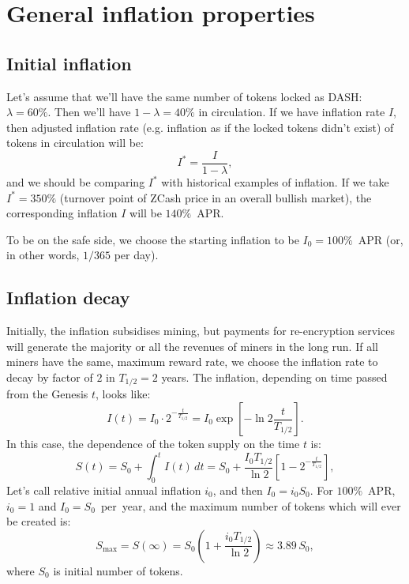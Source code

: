 \documentclass[longbibliography,nofootinbib,twocolumn]{revtex4-1}
\begin{document}
\section{General inflation properties}

\subsection{Initial inflation}

Let's assume that we'll have the same number of tokens locked as DASH: $\lambda=60\%$.
Then we'll have $1-\lambda=40\%$ in circulation.
If we have inflation rate $I$, then adjusted inflation rate (e.g. inflation as if the locked tokens didn't exist) of tokens in circulation will be:
\begin{equation}
    I^* = \frac{I}{1-\lambda},
\end{equation}
and we should be comparing $I^*$ with historical examples of inflation.
If we take $I^*=350\%$ (turnover point of ZCash price in an overall bullish market), the corresponding inflation $I$ will be $140\%$~APR.

To be on the safe side, we choose the starting inflation to be $I_0=100\%$~APR (or, in other words, $1/365$ per day).

\subsection{Inflation decay}

Initially, the inflation subsidises mining, but payments for re-encryption services will generate the majority or all the revenues of miners in the long run.
If all miners have the same, maximum reward rate, we choose the inflation rate to decay by factor of $2$ in $T_{1/2} = 2$ years.
The inflation, depending on time passed from the Genesis $t$, looks like:
\begin{equation}
    I(t) = I_0 \cdot 2^{-\frac{t}{T_{1/2}}} = I_0 \exp\left[ -\ln{2} \frac{t}{T_{1/2}} \right].
\end{equation}
In this case, the dependence of the token supply on the time $t$ is:
\begin{equation}
    \label{eq:supply-time}
    S(t) = S_0 + \int_0^{t} I(t)\, dt = S_0 + \frac{I_0 T_{1/2}}{\ln{2}}\left[1 - 2^{-\frac{t}{T_{1/2}}} \right],
\end{equation}
Let's call relative initial annual inflation $i_0$, and then $I_0 = i_0 S_0$.
For $100\%$~APR, $i_0=1$ and $I_0=S_0$~per~year, and the maximum number of tokens which will ever be created is:
\begin{equation}
    S_{\max} = S(\infty) = S_0\left(1 + \frac{i_0 T_{1/2}}{\ln{2}}\right) \approx 3.89\, S_0,
\end{equation}
where $S_0$ is initial number of tokens.
\end{document}
